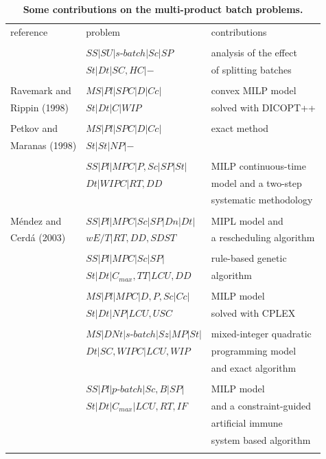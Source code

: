 \documentclass[10pt,fleqn,a4paper,twoside]{article}
\begin{document}
\begin{table}[ht]
\begin{center}
\caption{\textbf{Some contributions on the multi-product batch problems.}}
\begin{small}
\begin{tabular}[c]{l l l}
\\
reference & problem & contributions  \\
\cline {1-3} \\
\cite{Eilon1985} & $SS|SU|s\textrm{-}batch|Sc|SP$ &  analysis of the effect\\
& $St|Dt|SC, HC|-$  & of splitting batches \\
\cline {1-3} \\
Ravemark and & $MS|Pl|SPC|D|Cc|$ & convex MILP model \\
Rippin (1998) & $St|Dt|C|WIP$ & solved with DICOPT++ \\
\cline {1-3} \\
Petkov and & $MS|Pl|SPC|D|Cc|$ & exact method\\
Maranas (1998)  & $St|St|NP|-$ & \\
\cline {1-3} \\
\cite{MendezEtAll2000} & $SS|Pl|MPC|P,Sc|SP|St|$ & MILP continuous-time  \\
& $Dt|WIPC|RT, DD$ & model and a two-step  \\
& & systematic methodology \\
\cline {1-3} \\
Méndez and & $SS|Pl|MPC|Sc|SP|Dn|Dt|$ & MIPL model and \\
Cerdá (2003) &$wE/T|RT, DD, SDST$ & a rescheduling algorithm\\
\cline {1-3} \\
\cite{HeHui2008} & $SS|Pl|MPC|Sc|SP|$ & rule-based genetic \\
& $St|Dt|C_{max}, TT|LCU, DD$ & algorithm \\
\cline {1-3} \\
\cite{FumeroEtAl2016} & $MS|Pl|MPC|D,P,Sc|Cc|$ & MILP model \\
& $St|Dt|NP|LCU,USC$ & solved with CPLEX \\
\cline {1-3} \\
\cite{LiuEtAl2020} & $MS|DNt|s\textrm{-}batch|Sz|MP|St|$ & mixed-integer quadratic \\
& $Dt|SC,WIPC|LCU,WIP$ & programming model  \\
& & and exact algorithm \\
\cline {1-3} \\
\cite{LiEtAl2022} & $SS|Pl|p\textrm{-}batch|Sc,B|SP|$ & MILP model \\
& $St|Dt|C_{max}|LCU, RT, IF$ & and a constraint-guided \\
 & & artificial immune \\
 & & system based algorithm \\ 
\cline {1-3} \\
\end{tabular}
\label{tab:review}
\end{small}
\end{center}
\end{table} 
\end{document}
